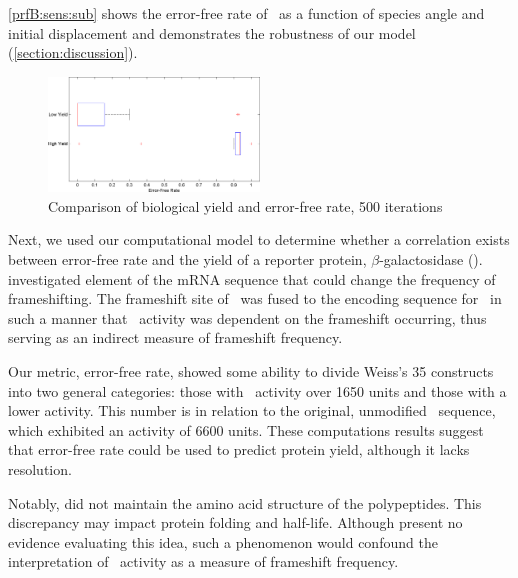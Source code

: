 \documentclass[12pt]{article}
\numberwithin{equation}{section}
\begin{document}
\autoref{prfB:sens:sub} shows the error-free rate of \prfB\ as a function
of species angle and initial displacement and demonstrates the
robustness of our model (\autoref{section:discussion}).

\begin{figure}
  \caption{Comparison of biological yield and error-free rate, 500 iterations}
  \label{weissboxplot}
  \includegraphics[width=0.5\textwidth]{histograms/weissbox}
\end{figure}

Next, we used our computational model to determine whether a correlation exists between 
error-free rate and the yield of a reporter protein, $\beta$-galactosidase (\bgals).  
\citet{weiss87} investigated element of the mRNA sequence that could change the frequency 
of frameshifting.  The frameshift site of \prfB\ was fused to the encoding sequence for 
\bgals\ in such a manner that \bgals\ activity was dependent on the frameshift occurring, 
thus serving as an indirect measure of frameshift frequency.  

Our metric, error-free rate, showed some ability to divide Weiss's 35 constructs into 
two general categories: those with \bgals\ activity over 1650 units and those with a 
lower activity.  This number is in relation to the original, unmodified \prfB\ sequence, 
which exhibited an activity of 6600 units.  These computations results suggest that 
error-free rate could be used to predict protein yield, although it lacks resolution.

Notably, \citeauthor{weiss87} did not maintain the amino acid structure of the polypeptides.  
This discrepancy may impact protein folding and half-life.  Although \citeauthor{weiss87} 
present no evidence evaluating this idea, such a phenomenon would confound the interpretation 
of \bgals\ activity as a measure of frameshift frequency.
\end{document}
